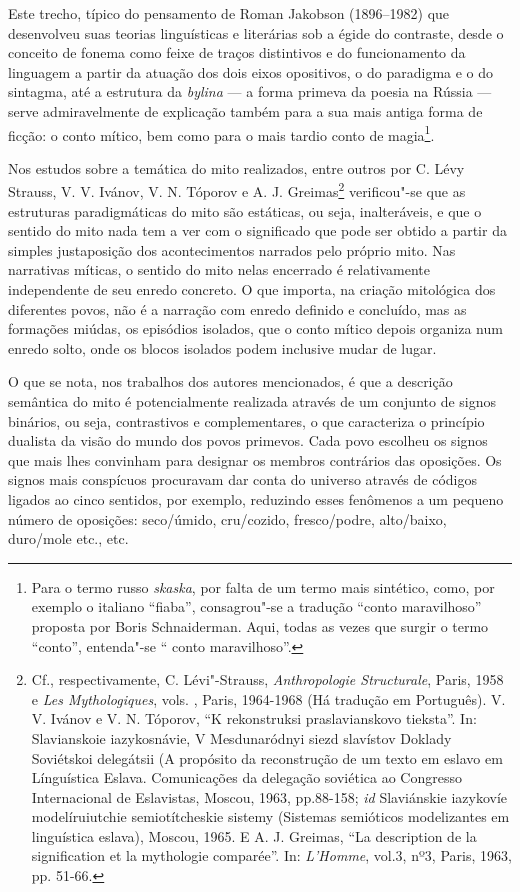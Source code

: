 {Este trecho, típico do pensamento de Roman Jakobson (1896--1982) que
desenvolveu suas teorias linguísticas e literárias sob a égide do
contraste, desde o conceito de fonema como feixe de traços distintivos e
do funcionamento da linguagem a partir da atuação dos dois eixos
opositivos, o do paradigma e o do sintagma, até a estrutura
da \emph{bylina} --- a forma primeva da poesia na Rússia --- serve
admiravelmente de explicação também para a sua mais antiga forma de
ficção: o conto mítico, bem como para o mais tardio conto de
magia\footnote{Para o termo russo \emph{skaska}, por falta de um termo
  mais sintético, como, por exemplo o italiano ``fiaba'', consagrou"-se
  a tradução ``conto maravilhoso'' proposta por Boris Schnaiderman. Aqui, todas as vezes que surgir o termo ``conto'', entenda"-se ``
  conto maravilhoso''.}.


Nos estudos sobre a temática do mito realizados, entre outros por C.
Lévy Strauss, V. V. Ivánov, V. N. Tóporov e A. J. Greimas\footnote{Cf.,
  respectivamente, C. Lévi"-Strauss, \emph{Anthropologie Structurale}, Paris,
  1958 e \emph{Les Mythologiques}, vols. , Paris, 1964-1968 (Há tradução
  em Português). V. V. Ivánov e V. N. Tóporov, ``K rekonstruksi
  praslavianskovo tieksta''. In: Slavianskoie iazykosnávie, V
  Mesdunaródnyi siezd slavístov Doklady Soviétskoi delegátsii (A
  propósito da reconstrução de um texto em eslavo em Línguística Eslava.
  Comunicações da delegação soviética ao  Congresso Internacional de
  Eslavistas, Moscou, 1963, pp.88-158; \emph{id} Slaviánskie iazykovíe
  modelíruiutchie semiotítcheskie sistemy (Sistemas semióticos
  modelizantes em linguística eslava), Moscou, 1965. E A. J. Greimas,
  ``La description de la signification et la mythologie
  comparée''. In: \emph{L'Homme}, vol.3, nº3, Paris, 1963, pp. 51-66.}
verificou"-se que as estruturas paradigmáticas do mito são estáticas, ou
seja, inalteráveis, e que o sentido do mito nada tem a ver com o
significado que pode ser obtido a partir da simples justaposição dos
acontecimentos narrados pelo próprio mito. Nas narrativas míticas, o
sentido do mito nelas encerrado é relativamente independente de seu
enredo concreto. O que importa, na criação mitológica dos diferentes
povos, não é a narração com enredo definido e concluído, mas as
formações miúdas, os episódios isolados, que o conto mítico depois
organiza num enredo solto, onde os blocos isolados podem inclusive mudar
de lugar.

O que se nota, nos trabalhos dos autores mencionados, é que a
descrição semântica do mito é potencialmente realizada através de um
conjunto de signos binários, ou seja, contrastivos e complementares,
o que caracteriza o princípio dualista da visão do mundo dos povos
primevos. Cada povo escolheu os signos que mais lhes convinham para
designar os membros contrários das oposições. Os signos mais conspícuos
procuravam dar conta do universo através de códigos ligados ao cinco
sentidos, por exemplo, reduzindo esses fenômenos a um pequeno número de
oposições: seco/úmido, cru/cozido, fresco/podre, alto/baixo, duro/mole
etc., etc.

}
